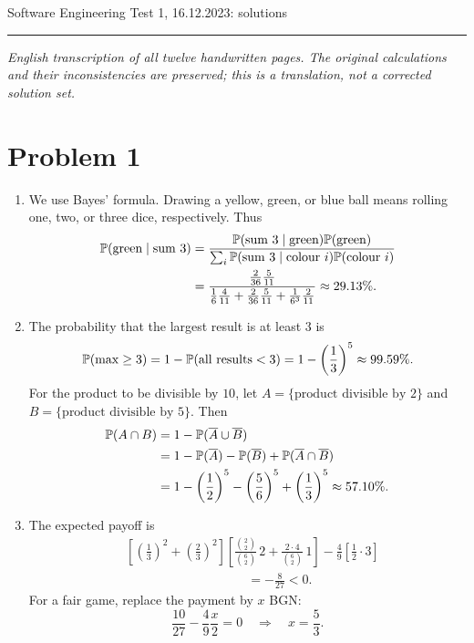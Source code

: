 \documentclass[a4paper]{article}
\begin{document}
\noindent Software Engineering \hfill Test 1, 16.12.2023: solutions
\par\smallskip\hrule\smallskip\noindent
\textit{English transcription of all twelve handwritten pages. The original calculations and their inconsistencies are preserved; this is a translation, not a corrected solution set.}

\section*{Problem 1}
\begin{enumerate}
\item We use Bayes' formula. Drawing a yellow, green, or blue ball means rolling one, two, or three dice, respectively. Thus
\begin{align*}
\P(\text{green}\mid\text{sum }3)
&=\frac{\P(\text{sum }3\mid\text{green})\P(\text{green})}
{\sum_i\P(\text{sum }3\mid\text{colour }i)\P(\text{colour }i)}\\
&=\frac{\frac2{36}\frac5{11}}
{\frac16\frac4{11}+\frac2{36}\frac5{11}+\frac1{6^3}\frac2{11}}
\approx29.13\%.
\end{align*}
\item The probability that the largest result is at least $3$ is
\[
\P(\max\geq3)=1-\P(\text{all results}<3)
=1-\left(\frac13\right)^5\approx99.59\%.
\]
For the product to be divisible by $10$, let $A=\{\text{product divisible by }2\}$
and $B=\{\text{product divisible by }5\}$. Then
\begin{align*}
\P(A\cap B)
&=1-\P(\overline A\cup\overline B)\\
&=1-\P(\overline A)-\P(\overline B)+\P(\overline A\cap\overline B)\\
&=1-\left(\frac12\right)^5-\left(\frac56\right)^5
+\left(\frac13\right)^5\approx57.10\%.
\end{align*}
\item The expected payoff is
\begin{align*}
&\left[\left(\frac13\right)^2+\left(\frac23\right)^2\right]
\left[\frac{\binom22}{\binom62}\,2
+\frac{2\cdot4}{\binom62}\,1\right]
-\frac49\left[\frac12\cdot3\right]\\
&\hspace{4cm}=-\frac8{27}<0.
\end{align*}
For a fair game, replace the payment by $x$ BGN:
\[
\frac{10}{27}-\frac49\frac x2=0
\quad\Longrightarrow\quad \boxed{x=\frac53}.
\]
\end{enumerate}
\end{document}
